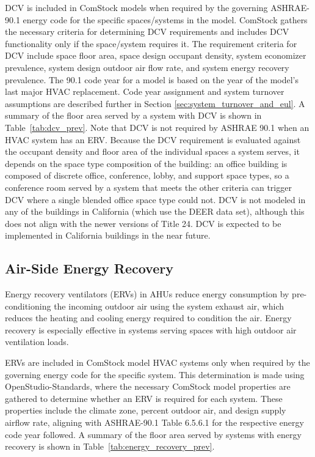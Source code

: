 DCV is included in ComStock models when required by the governing ASHRAE-90.1 energy code for the specific spaces/systems in the model. ComStock gathers the necessary criteria for determining DCV requirements and includes DCV functionality only if the space/system requires it. The requirement criteria for DCV include space floor area, space design occupant density, system economizer prevalence, system design outdoor air flow rate, and system energy recovery prevalence. The 90.1 code year for a model is based on the year of the model's last major HVAC replacement. Code year assignment and system turnover assumptions are described further in Section \ref{sec:system_turnover_and_eul}. A summary of the floor area served by a system with DCV is shown in Table~\ref{tab:dcv_prev}. Note that DCV is not required by ASHRAE 90.1 when an HVAC system has an ERV. Because the DCV requirement is evaluated against the occupant density and floor area of the individual spaces a system serves, it depends on the space type composition of the building: an office building is composed of discrete office, conference, lobby, and support space types, so a conference room served by a system that meets the other criteria can trigger DCV where a single blended office space type could not. DCV is not modeled in any of the buildings in California (which use the DEER data set), although this does not align with the newer versions of Title 24. DCV is expected to be implemented in California buildings in the near future.


\subsection{Air-Side Energy Recovery}
\label{sec:erv}

Energy recovery ventilators (ERVs) in AHUs reduce energy consumption by pre-conditioning the incoming outdoor air using the system exhaust air, which reduces the heating and cooling energy required to condition the air. Energy recovery is especially effective in systems serving spaces with high outdoor air ventilation loads.

ERVs are included in ComStock model HVAC systems only when required by the governing energy code for the specific system. This determination is made using OpenStudio-Standards, where the necessary ComStock model properties are gathered to determine whether an ERV is required for each system. These properties include the climate zone, percent outdoor air, and design supply airflow rate, aligning with ASHRAE-90.1 Table 6.5.6.1 for the respective energy code year followed. A summary of the floor area served by systems with energy recovery is shown in Table~\ref{tab:energy_recovery_prev}.

